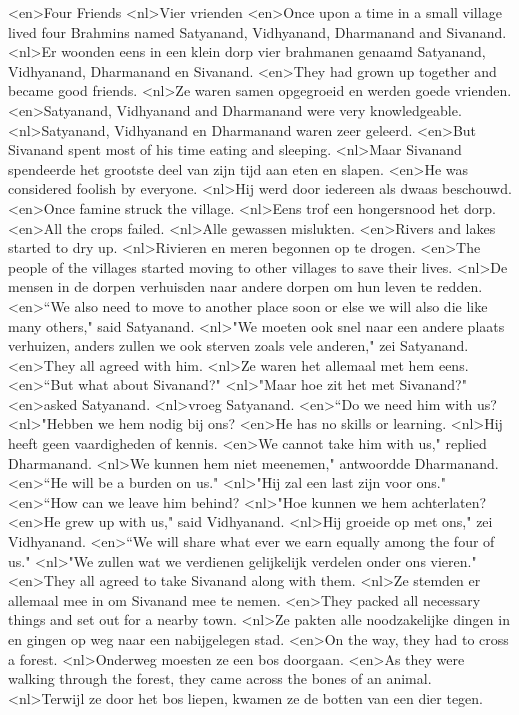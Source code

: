 <en>Four Friends
<nl>Vier vrienden
<en>Once upon a time in a small village lived four Brahmins named Satyanand, Vidhyanand, Dharmanand and Sivanand.
<nl>Er woonden eens in een klein dorp vier brahmanen genaamd Satyanand, Vidhyanand, Dharmanand en Sivanand.
<en>They had grown up together and became good friends.
<nl>Ze waren samen opgegroeid en werden goede vrienden.
<en>Satyanand, Vidhyanand and Dharmanand were very knowledgeable.
<nl>Satyanand, Vidhyanand en Dharmanand waren zeer geleerd.
<en>But Sivanand spent most of his time eating and sleeping.
<nl>Maar Sivanand spendeerde het grootste deel van zijn tijd aan eten en slapen.
<en>He was considered foolish by everyone.
<nl>Hij werd door iedereen als dwaas beschouwd.
<en>Once famine struck the village.
<nl>Eens trof een hongersnood het dorp.
<en>All the crops failed.
<nl>Alle gewassen mislukten.
<en>Rivers and lakes started to dry up.
<nl>Rivieren en meren begonnen op te drogen.
<en>The people of the villages started moving to other villages to save their lives.
<nl>De mensen in de dorpen verhuisden naar andere dorpen om hun leven te redden.
<en>“We also need to move to another place soon or else we will also die like many others," said Satyanand.
<nl>"We moeten ook snel naar een andere plaats verhuizen, anders zullen we ook sterven zoals vele anderen," zei Satyanand.
<en>They all agreed with him.
<nl>Ze waren het allemaal met hem eens.
<en>“But what about Sivanand?"
<nl>"Maar hoe zit het met Sivanand?"
<en>asked Satyanand.
<nl>vroeg Satyanand.
<en>“Do we need him with us?
<nl>"Hebben we hem nodig bij ons?
<en>He has no skills or learning.
<nl>Hij heeft geen vaardigheden of kennis.
<en>We cannot take him with us," replied Dharmanand.
<nl>We kunnen hem niet meenemen," antwoordde Dharmanand.
<en>“He will be a burden on us."
<nl>"Hij zal een last zijn voor ons."
<en>“How can we leave him behind?
<nl>"Hoe kunnen we hem achterlaten?
<en>He grew up with us," said Vidhyanand.
<nl>Hij groeide op met ons," zei Vidhyanand.
<en>“We will share what ever we earn equally among the four of us."
<nl>"We zullen wat we verdienen gelijkelijk verdelen onder ons vieren."
<en>They all agreed to take Sivanand along with them.
<nl>Ze stemden er allemaal mee in om Sivanand mee te nemen.
<en>They packed all necessary things and set out for a nearby town.
<nl>Ze pakten alle noodzakelijke dingen in en gingen op weg naar een nabijgelegen stad.
<en>On the way, they had to cross a forest.
<nl>Onderweg moesten ze een bos doorgaan.
<en>As they were walking through the forest, they came across the bones of an animal.
<nl>Terwijl ze door het bos liepen, kwamen ze de botten van een dier tegen.
